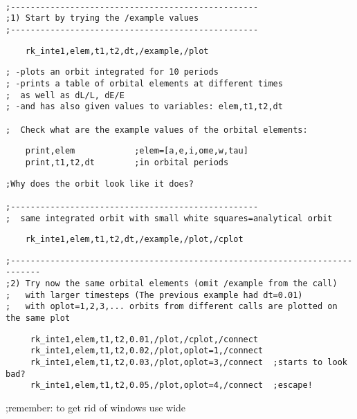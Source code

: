 \documentclass[a4paper,12pt]{article}
\def\red{\color{red}}
\def\black{\color{RGBblack}}
\begin{document}
\small
\newpage

\black
\begin{verbatim}

;--------------------------------------------------
;1) Start by trying the /example values
;--------------------------------------------------
\end{verbatim}
\red
\begin{verbatim}
    rk_inte1,elem,t1,t2,dt,/example,/plot
\end{verbatim}
\black
\begin{verbatim}
; -plots an orbit integrated for 10 periods 
; -prints a table of orbital elements at different times
;  as well as dL/L, dE/E
; -and has also given values to variables: elem,t1,t2,dt

;  Check what are the example values of the orbital elements:
\end{verbatim}
\red
\begin{verbatim}
    print,elem            ;elem=[a,e,i,ome,w,tau]
    print,t1,t2,dt        ;in orbital periods
\end{verbatim}
\black
\begin{verbatim}
;Why does the orbit look like it does?

;--------------------------------------------------
;  same integrated orbit with small white squares=analytical orbit
\end{verbatim}
\red
\begin{verbatim}
    rk_inte1,elem,t1,t2,dt,/example,/plot,/cplot
\end{verbatim}
\black
\begin{verbatim}
;----------------------------------------------------------------------------
;2) Try now the same orbital elements (omit /example from the call)
;   with larger timesteps (The previous example had dt=0.01)
;   with oplot=1,2,3,... orbits from different calls are plotted on the same plot
\end{verbatim}
\red
\begin{verbatim}
     rk_inte1,elem,t1,t2,0.01,/plot,/cplot,/connect
     rk_inte1,elem,t1,t2,0.02,/plot,oplot=1,/connect
     rk_inte1,elem,t1,t2,0.03,/plot,oplot=3,/connect  ;starts to look bad?
     rk_inte1,elem,t1,t2,0.05,/plot,oplot=4,/connect  ;escape!
\end{verbatim}
\black
;remember: to get rid of windows use \red wide
\end{document}
